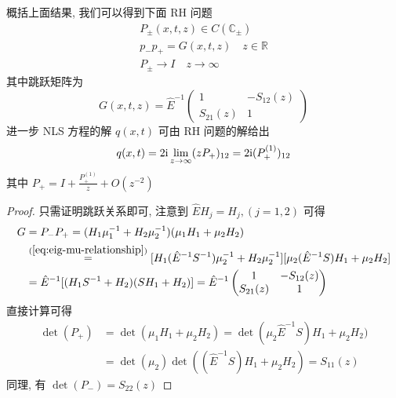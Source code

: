 \begin{definition}
  概括上面结果, 我们可以得到下面 RH 问题
  \begin{align}
    P_{\pm}(x,t,z) \in C(\mathbb{C}_{\pm})  \label{eq:RHP-1} \\
    p_{-}p_{+} = G(x,t,z) \quad z \in \mathbb{R} \label{eq:RHP-2}\\
    P_{\pm} \to I \quad z \to \infty \label{eq:RHP-3}
  \end{align}
  其中跳跃矩阵为
  \begin{equation}
    G(x,t,z) = \hat{E}^{-1} \begin{pmatrix}
      1 & -S_{12}(z) \\ S_{21}(z) & 1
    \end{pmatrix}
  \end{equation}
  进一步 NLS 方程的解 $ q(x,t) $ 可由 RH 问题的解给出
  \begin{equation}
    q(x,t) = 2 \mathrm{i} \lim_{z \to \infty} (z P_{+})_{12} = 2 \mathrm{i} (P_{+}^{(1)})_{12}
  \end{equation}
  其中 $ P_{+} = I + \frac{P_{+}^{(1)}}{z} + O(z^{-2}) $
\end{definition}
\begin{proof}
  只需证明跳跃关系即可, 注意到 $ \hat{E} H_{j} = H_{j}, (j=1,2) $ 可得 
  \begin{equation}
    \begin{aligned}
      G &= P_{-}P_{+} = (H_{1} \mu_{1}^{-1} + H_{2} \mu_{2}^{-1})(\mu_{1} H_{1} + \mu_{2} H_{2}) \\
        &\overset{(\ref{eq:eig-mu-relationship})}{=} [H_{1}(\hat{E}^{-1} S^{-1})\mu_{2}^{-1} + H_{2}\mu_{2}^{-1}]  [\mu_{2}(\hat{E}^{-1} S)H_{1} + \mu_{2}H_{2}] \\
        &= \hat{E}^{-1} [(H_{1}S^{-1} + H_2)(SH_{1} + H_{2})] = \hat{E}^{-1} \begin{pmatrix}
          1 & -S_{12}(z) \\ S_{21}(z) & 1
        \end{pmatrix}
    \end{aligned}
  \end{equation}
  直接计算可得
  \begin{equation}
    \begin{aligned}
    \det(P_{+}) &= \det(\mu_{1}H_{1} + \mu_{2} H_{2}) = \det(\mu_{2} \hat{E}^{-1} S) H_{1} + \mu_{2}H_{2}) \\
    &=\det(\mu_{2}) \det((\hat{E}^{-1} S) H_{1} + \mu_{2}H_{2}) = S_{11}(z)
    \end{aligned}
  \end{equation}
  同理, 有 $ \det(P_{-}) = S_{22}(z) $
\end{proof}

